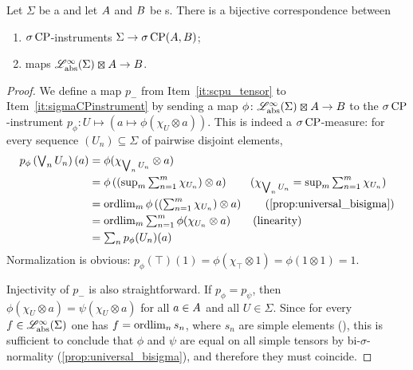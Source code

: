 \begin{theorem}\label{thm:sigmaCPinstruments}
	Let $\Sigma$ be a \bsigma{} and let ${A}$ and ${B}$ be \cstars{}s.
	There is a bijective correspondence between
	\begin{enumerate}
		\item\label{it:sigmaCPinstrument} $\sigma\operatorname{CP}$-instruments $\Sigma \to \sigma\operatorname{CP}({A},{B})$;
		\item\label{it:scpu_tensor} \scpu{} maps $\Linfbool(\Sigma)\kocktensor \A \to \B$.
	\end{enumerate}
\end{theorem}
\begin{proof}
	We define a map $p_{-}$ from Item~\ref{it:scpu_tensor} to Item~\ref{it:sigmaCPinstrument} by sending a \scpu{} map $\phi\colon \Linfbool(\Sigma)\kocktensor \A \to \B$ to the $\sigma\operatorname{CP}$-instrument $p_{\phi}\colon U \mapsto (a\mapsto \phi(\chi_U \otimes a))$.
	This is indeed a $\sigma\operatorname{CP}$-measure: for every sequence $(U_n)\subseteq \Sigma$ of pairwise disjoint elements,
	\begin{align*}
		\textstyle p_{\phi}\left(\bigvee_n U_n\right)(a) & \textstyle =\phi(\chi_{\bigvee_n U_n} \otimes a)                                                                                                  \\
		                                                 & \textstyle = \phi \left(\left(\sup_m \sum_{n=1}^m\chi_{U_n} \right)\otimes a\right)   \tag{$\chi_{\bigvee_n U_n}=\sup_m \sum_{n=1}^m \chi_{U_n}$} \\
		                                                 & \textstyle = \olim_m \phi\left(\left(\sum_{n=1}^m\chi_{U_n} \right) \otimes a \right) \tag{\cref{prop:universal_bisigma}}                         \\
		                                                 & \textstyle = \olim_m \sum_{n=1}^m \phi(\chi_{U_n}\otimes a)                           \tag{linearity}                                             \\
		                                                 & \textstyle = \sum_{n} p_{\phi} (U_n)(a)
	\end{align*}
	Normalization is obvious: $p_{\phi}(\top)(1)=\phi(\chi_{\top}\otimes 1)= \phi(1\otimes 1)=1$.

	Injectivity of $p_{-}$ is also straightforward.
	If $p_{\phi}=p_{\psi}$, then $\phi(\chi_U\otimes a)=\psi(\chi_U\otimes a)$ for all $a\in {A}$ and all $U\in\Sigma$. Since for every $f\in \mathscr{L}_{\operatorname{abs}}^{\infty}(\Sigma)$ one has $f=\operatorname{ordlim}_n s_n$, where $s_n$ are simple elements (\cite[Corollary 3.4.4]{fritz2025categories}), this is sufficient to conclude that $\phi$ and $\psi$ are equal on all simple tensors by bi-$\sigma$-normality (\cref{prop:universal_bisigma}), and therefore they must coincide.


\end{proof}
